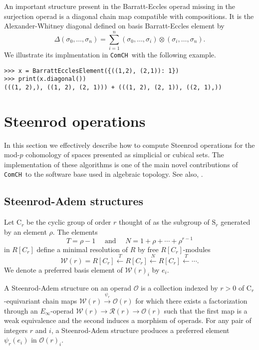\documentclass{amsart}
\newcommand{\comch}{\texttt{ComCH}}
\begin{document}
An important structure present in the Barratt-Eccles operad missing in the surjection operad is a diagonal chain map compatible with compositions. It is the Alexander-Whitney diagonal defined on basis Barratt-Eccles element by
\begin{equation*}
\Delta(\sigma_0, \dots, \sigma_n) = \sum_{i=1}^n (\sigma_0, \dots, \sigma_i) \otimes (\sigma_i, \dots, \sigma_n).
\end{equation*}
We illustrate its implmentation in \comch\, with the following example.
\begin{verbatim}
>>> x = BarrattEcclesElement({((1,2), (2,1)): 1})
>>> print(x.diagonal())
(((1, 2),), ((1, 2), (2, 1))) + (((1, 2), (2, 1)), ((2, 1),))
\end{verbatim}

\section{Steenrod operations} \label{s: steenrod operations}

In this section we effectively describe how to compute Steenrod operations for the mod-$p$ cohomology of spaces presented as simplicial or cubical sets. The implementation of these algorithms is one of the main novel contributions of \comch\, to the software base used in algebraic topology. See also, \cite{}.

\subsection{Steenrod-Adem structures}

Let $\mathrm{C}_r$ be the cyclic group of order $r$ thought of as the subgroup of $\mathrm{S}_r$ generated by an element $\rho$. The elements
\begin{equation*}
T = \rho-1 \quad \text{ and } \quad N = 1+\rho+\cdots+\rho^{r-1}
\end{equation*}
in $R[C_r]$ define a minimal resolution of $R$ by free $R[C_r]$-modules
\begin{equation*}
\mathcal W(r) = R[C_r] \stackrel{T}{\longleftarrow} R[C_r] \stackrel{N}{\longleftarrow} R[C_r] \stackrel{T}{\longleftarrow} \cdots.
\end{equation*}
We denote
a preferred basis element of $\mathcal W(r)_i$ by $e_i$.

A Steenrod-Adem structure on an operad $\mathcal O$ is a collection indexed by $r > 0$ of $\mathrm C_r$-equivariant chain maps $\mathcal W(r) \stackrel{\psi_r}{\longrightarrow} \mathcal O(r)$ for which there exists a factorization through an $E_\infty$-operad $\mathcal W(r) \to \mathcal R(r) \to \mathcal O(r)$ such that the first map is a weak equivalence and the second induces a morphism of operads.
For any pair of integers $r$ and $i$, a Steenrod-Adem structure produces a preferred element $\psi_r(e_i)$ in $\mathcal O(r)_i$.
\end{document}
